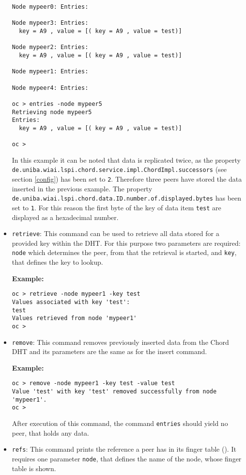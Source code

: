 \begin{itemize}
\begin{verbatim}
Node mypeer0: Entries:

Node mypeer3: Entries:
  key = A9 , value = [( key = A9 , value = test)]

Node mypeer2: Entries:
  key = A9 , value = [( key = A9 , value = test)]

Node mypeer1: Entries:

Node mypeer4: Entries:

oc > entries -node mypeer5
Retrieving node mypeer5
Entries:
  key = A9 , value = [( key = A9 , value = test)]

oc >
\end{verbatim}
In this example it can be noted that data is replicated twice, as the 
property 
{\tt de.\-uniba.\-wiai.\-lspi.\-chord.\-service.\-impl.\-ChordImpl.\-successors} 
(see section \ref{config}) has been set to {\tt 2}. Therefore three peers 
have stored the data inserted in the previous example. 
The property 
{\tt de.\-uniba.\-wiai.\-lspi.\-chord.\-data.\-ID.\-number.\-of.\-displayed.\-bytes}
has been set to {\tt 1}. For this reason the first byte of the key of data item 
{\tt test} are displayed as a hexadecimal number. 
%
\item {\tt retrieve}: This command can be used to retrieve all data stored 
for a provided key within the DHT. For this purpose two parameters are required:  
{\tt node} which determines the peer, from that the retrieval is started, and 
{\tt key}, that defines the key to lookup. 

{\bf Example:}
\begin{verbatim}
oc > retrieve -node mypeer1 -key test
Values associated with key 'test':
test
Values retrieved from node 'mypeer1'
oc >
\end{verbatim}
%
\item {\tt remove}: This command removes previously inserted data from 
the Chord DHT and its parameters are the same as for the insert command. 

{\bf Example:}
\begin{verbatim}
oc > remove -node mypeer1 -key test -value test
Value 'test' with key 'test' removed successfully from node 'mypeer1'.
oc >
\end{verbatim}
After execution of this command, the command {\tt entries} should yield no 
peer, that holds any data. 
%
\item {\tt refs}: This command prints the reference a peer has in 
its finger table (\cite{stoica01chord}). It requires one parameter 
{\tt node}, that defines the name of the node, whose finger table 
is shown. 


\end{itemize}
